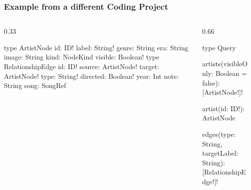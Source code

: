 \documentclass{beamer}
\begin{document}
\begin{frame}[fragile]     
\frametitle{Example from a different Coding Project}  

\tiny
\begin{columns}[T,onlytextwidth]
\begin{column}{0.33\textwidth}
\begin{semiverbatim}
\pause
    type ArtistNode {
      id: ID!
      label: String!
      genre: String
      era: String
      image: String
      kind: NodeKind
      visible: Boolean!
    }
\pause
    type RelationshipEdge {
      id: ID!
      source: ArtistNode!
      target: ArtistNode!
      type: String!
      directed: Boolean!
      year: Int
      note: String
      song: SongRef
    }
\end{semiverbatim}
\end{column}
\begin{column}{0.66\textwidth}
\begin{semiverbatim}
\pause
    type Query {
      artists(visibleOnly: Boolean = false): [ArtistNode!]!
    
      artist(id: ID!): ArtistNode
    
      edges(type: String, targetLabel: String): [RelationshipEdge!]!
    }
\end{semiverbatim}
\end{column}
\end{columns}

\end{frame}
\end{document}
